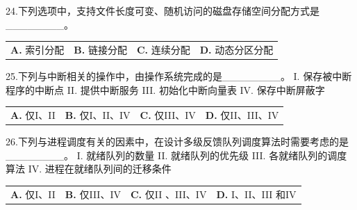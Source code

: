 \documentclass[UTF8,11pt]{ctexart}
\begin{document}
24.下列选项中，支持文件长度可变、随机访问的磁盘存储空间分配方式是\_\_\_\_\_\_\_\_。


\begin{center}\begin{tabular}{>{\raggedright\arraybackslash}p{\dimexpr(\linewidth-8\tabcolsep)/4\relax}>{\raggedright\arraybackslash}p{\dimexpr(\linewidth-8\tabcolsep)/4\relax}>{\raggedright\arraybackslash}p{\dimexpr(\linewidth-8\tabcolsep)/4\relax}>{\raggedright\arraybackslash}p{\dimexpr(\linewidth-8\tabcolsep)/4\relax}}
\textbf{A.} 索引分配 & \textbf{B.} 链接分配 & \textbf{C.} 连续分配 & \textbf{D.} 动态分区分配\\[.35em]\end{tabular}\end{center}

25.下列与中断相关的操作中，由操作系统完成的是\_\_\_\_\_\_\_\_。 I. 保存被中断程序的中断点 II. 提供中断服务 III. 初始化中断向量表 IV. 保存中断屏蔽字


\begin{center}\begin{tabular}{>{\raggedright\arraybackslash}p{\dimexpr(\linewidth-8\tabcolsep)/4\relax}>{\raggedright\arraybackslash}p{\dimexpr(\linewidth-8\tabcolsep)/4\relax}>{\raggedright\arraybackslash}p{\dimexpr(\linewidth-8\tabcolsep)/4\relax}>{\raggedright\arraybackslash}p{\dimexpr(\linewidth-8\tabcolsep)/4\relax}}
\textbf{A.} 仅I、II & \textbf{B.} 仅I、II、IV & \textbf{C.} 仅III、IV & \textbf{D.} 仅II、III、IV\\[.35em]\end{tabular}\end{center}

26.下列与进程调度有关的因素中，在设计多级反馈队列调度算法时需要考虑的是\_\_\_\_\_\_\_\_。 I. 就绪队列的数量 II. 就绪队列的优先级 III. 各就绪队列的调度算法 IV. 进程在就绪队列间的迁移条件


\begin{center}\begin{tabular}{>{\raggedright\arraybackslash}p{\dimexpr(\linewidth-8\tabcolsep)/4\relax}>{\raggedright\arraybackslash}p{\dimexpr(\linewidth-8\tabcolsep)/4\relax}>{\raggedright\arraybackslash}p{\dimexpr(\linewidth-8\tabcolsep)/4\relax}>{\raggedright\arraybackslash}p{\dimexpr(\linewidth-8\tabcolsep)/4\relax}}
\textbf{A.} 仅I、II & \textbf{B.} 仅III、IV & \textbf{C.} 仅II 、III、IV & \textbf{D.} I、II、III 和IV\\[.35em]\end{tabular}\end{center}
\end{document}
